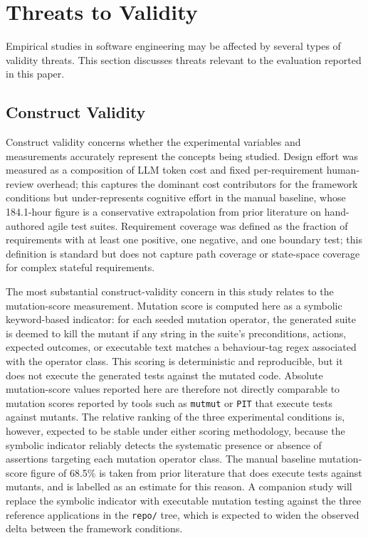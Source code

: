 \documentclass[11pt,letterpaper]{article}
\begin{document}
\section{Threats to Validity}
\label{sec:validity}

Empirical studies in software engineering may be affected by several types of validity threats. This section discusses threats relevant to the evaluation reported in this paper.

\subsection{Construct Validity}

Construct validity concerns whether the experimental variables and measurements accurately represent the concepts being studied. Design effort was measured as a composition of LLM token cost and fixed per-requirement human-review overhead; this captures the dominant cost contributors for the framework conditions but under-represents cognitive effort in the manual baseline, whose 184.1-hour figure is a conservative extrapolation from prior literature on hand-authored agile test suites. Requirement coverage was defined as the fraction of requirements with at least one positive, one negative, and one boundary test; this definition is standard but does not capture path coverage or state-space coverage for complex stateful requirements.

The most substantial construct-validity concern in this study relates to the mutation-score measurement. Mutation score is computed here as a symbolic keyword-based indicator: for each seeded mutation operator, the generated suite is deemed to kill the mutant if any string in the suite's preconditions, actions, expected outcomes, or executable text matches a behaviour-tag regex associated with the operator class. This scoring is deterministic and reproducible, but it does not execute the generated tests against the mutated code. Absolute mutation-score values reported here are therefore not directly comparable to mutation scores reported by tools such as \texttt{mutmut} or \texttt{PIT} that execute tests against mutants. The relative ranking of the three experimental conditions is, however, expected to be stable under either scoring methodology, because the symbolic indicator reliably detects the systematic presence or absence of assertions targeting each mutation operator class. The manual baseline mutation-score figure of 68.5\% is taken from prior literature that does execute tests against mutants, and is labelled as an estimate for this reason. A companion study will replace the symbolic indicator with executable mutation testing against the three reference applications in the \texttt{repo/} tree, which is expected to widen the observed delta between the framework conditions.
\end{document}
